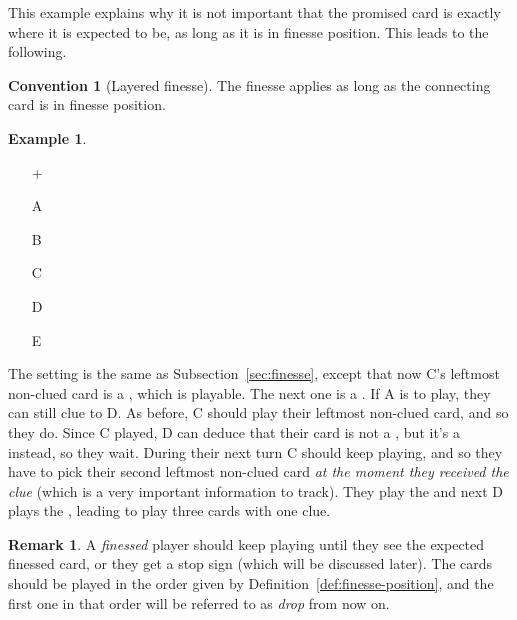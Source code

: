 \documentclass[a4paper]{article}
\theoremstyle{plain}
\theoremstyle{definition}
\newtheorem{remark}[theorem]{Remark}
\newtheorem{example}[theorem]{Example}
\newtheorem{convention}[theorem]{Convention}
\begin{document}
This example explains why it is not important that the promised card is exactly where it is expected to be, as long as it is in finesse position. This leads to the following.

\begin{convention}[Layered finesse]
	\label{layered-finesse}
	The finesse applies as long as the connecting card is in finesse position.
\end{convention}

\begin{example} \hfill \\
	\begin{minipage}{0.45\textwidth}
		\begin{itemize}
			\item[\Large +]      
			\item[\Large A]    
			\item[\Large B]    
			\item[\Large C]    
			\item[\Large D]    
			\item[\Large E]    
		\end{itemize}
	\end{minipage}%
	\begin{minipage}{0.55\textwidth}
		The setting is the same as Subsection~\ref{sec:finesse}, except that now C's leftmost non-clued card is a , which is playable. The next one is a . If A is to play, they can still clue  to D. As before, C should play their leftmost non-clued card, and so they do. Since C played, D can deduce that their card is not a , but it's a  instead, so they wait. During their next turn C should keep playing, and so they have to pick their second leftmost non-clued card \emph{at the moment they received the clue} (which is a very important information to track). They play the  and next D plays the , leading to play three cards with one clue.
	\end{minipage}
\end{example} \vspace{0.15 cm}

\begin{remark}
	A \emph{finessed} player should keep playing until they see the expected finessed card, or they get a stop sign (which will be discussed later). The cards should be played in the order given by Definition~\ref{def:finesse-position}, and the first one in that order will be referred to as \emph{drop} from now on.
\end{remark}
\end{document}
